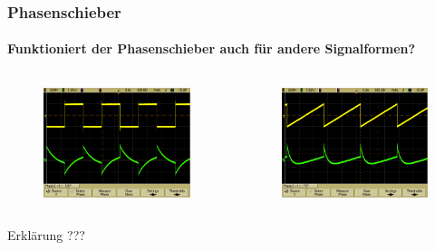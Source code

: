 \begin{frame}
\frametitle{Phasenschieber}
\framesubtitle{Funktioniert der Phasenschieber auch für andere Signalformen?}
    \begin{columns}[c]
        \begin{figure}[H]
        \begin{center}
                \includegraphics[scale=0.1]{./img/oszi/scope_10.png}
        \end{center}
        \end{figure}
        \begin{figure}[H]
        \begin{center}
                \includegraphics[scale=0.1]{./img/oszi/scope_12.png}
        \end{center}
        \end{figure}
    \end{columns}
    \begin{block}{Erklärung}
        ??? 
    \end{block}
\end{frame}

